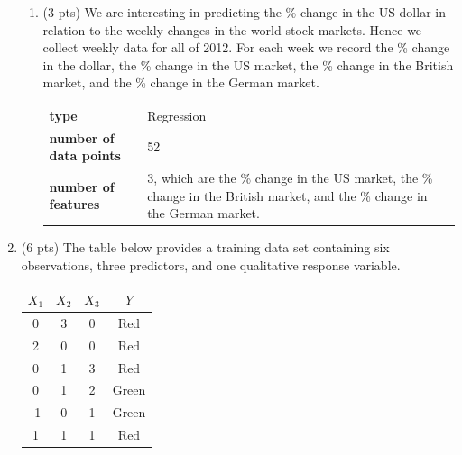 \documentclass[a4paper]{article}
\theoremstyle{definition}
\newenvironment{soln}{
    \leavevmode\color{blue}\ignorespaces
}{}
\begin{document}
\begin{enumerate}
\begin{enumerate}
		      \item (3 pts) We are interesting in predicting the \% change in the US dollar in relation to the weekly changes in the world stock markets. Hence we collect weekly data for all of 2012. For each week we record the \% change in the dollar, the \% change in the US market, the \% change in the British market, and the \% change in the German market.

		            \begin{soln}
			            \begin{tabular}{l p{}}
				            \textbf{type}                  & Regression                                                                                                                \\
				            \textbf{number of data points} & 52                                                                                                                        \\
				            \textbf{number of features}    & 3, which are the \% change in the US market, the \% change in the British market, and the \% change in the German market.
			            \end{tabular}
		            \end{soln}

	      \end{enumerate}

	\item (6 pts) The table below provides a training data set containing six observations, three predictors, and one qualitative response variable.

	      \begin{center}
		      \begin{tabular}{ c  c  c  c}
			      \hline
			      $X_{1}$ & $X_{2}$ & $X_{3}$ & $Y$   \\ \hline
			      0       & 3       & 0       & Red   \\
			      2       & 0       & 0       & Red   \\
			      0       & 1       & 3       & Red   \\
			      0       & 1       & 2       & Green \\
			      -1      & 0       & 1       & Green \\
			      1       & 1       & 1       & Red   \\
			      \hline
		      \end{tabular}
	      \end{center}


\end{enumerate}
\end{document}
